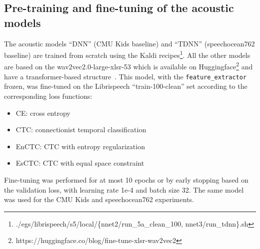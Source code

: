 \subsection{Pre-training and fine-tuning of the acoustic models}
\label{sec:expeirments-AM}
The acoustic models ``DNN'' (CMU Kids baseline) and ``TDNN'' (speechocean762 baseline) are trained from scratch using the Kaldi recipes\footnote{./egs/librispeech/s5/local/\{nnet2/run\_5a\_clean\_100, nnet3/run\_tdnn\}.sh}.
All the other models are based on the wav2vec2.0-large-xlsr-53 \cite{conneau21_interspeech} which is available on Huggingface\footnote{https://huggingface.co/blog/fine-tune-xlsr-wav2vec2} and have a transformer-based structure~\cite{w2v2}.
This model, with the \texttt{feature\_extractor} frozen, was fine-tuned on the Librispeech ``train-100-clean'' set according to the corresponding loss functions:
\begin{itemize}
    \item CE: cross entropy
    \item CTC: connectionist temporal classification
    \item EnCTC: CTC with entropy regularization \cite{CTC-ME}
    \item EsCTC: CTC with equal space constraint \cite{CTC-ME}
\end{itemize}
Fine-tuning was performed for at most 10 epochs or by early stopping based on the validation loss, with learning rate 1e-4 and batch size 32.
The same model was used for the CMU Kids and speechocean762 experiments.


